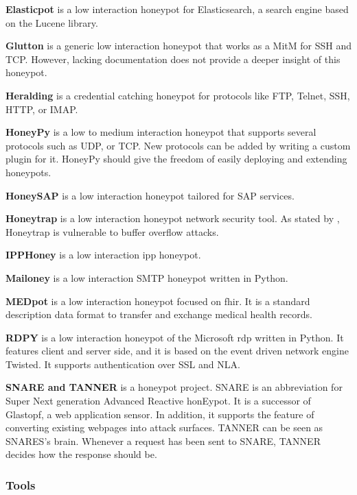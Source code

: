 \textbf{Elasticpot} \cite{elasticpot2021} is a low interaction honeypot for Elasticsearch, a search engine based on the Lucene library.

\textbf{Glutton} \cite{glutton2021} is a generic low interaction honeypot that works as a MitM for SSH and TCP.
However, lacking documentation does not provide a deeper insight of this honeypot.

\textbf{Heralding} \cite{heralding2021} is a credential catching honeypot for protocols like FTP, Telnet, SSH, HTTP, or IMAP.

\textbf{HoneyPy} \cite{honeysap2021} is a low to medium interaction honeypot that supports several protocols such as UDP, or TCP.
New protocols can be added by writing a custom plugin for it.
HoneyPy should give the freedom of easily deploying and extending honeypots.

\textbf{HoneySAP} \cite{honeysap2021} is a low interaction honeypot tailored for SAP services.

\textbf{Honeytrap} \cite{honeytrap2021} is a low interaction honeypot network security tool.
As stated by \citet*{honeytrap2021}, Honeytrap is vulnerable to buffer overflow attacks.

\textbf{IPPHoney} \cite{ipphoney2021} is a low interaction \ac{ipp} honeypot.

\textbf{Mailoney} \cite{mailoney2021} is a low interaction SMTP honeypot written in Python.

\textbf{MEDpot} \cite{medpot2021} is a low interaction honeypot focused on \ac{fhir}.
It is a standard description data format to transfer and exchange medical health records.

\textbf{RDPY} \cite{rdpy2021} is a low interaction honeypot of the Microsoft \ac{rdp} written in Python.
It features client and server side, and it is based on the event driven network engine Twisted.
It supports authentication over SSL and NLA.

\textbf{SNARE and TANNER} \cite{snare2021, tanner2021} is a honeypot project.
SNARE is an abbreviation for Super Next generation Advanced Reactive honEypot.
It is a successor of Glastopf, a web application sensor.
In addition, it supports the feature of converting existing webpages into attack surfaces.
TANNER \cite{tanner2021} can be seen as SNARES's brain.
Whenever a request has been sent to SNARE, TANNER decides how the response should be.

\subsubsection{Tools}

